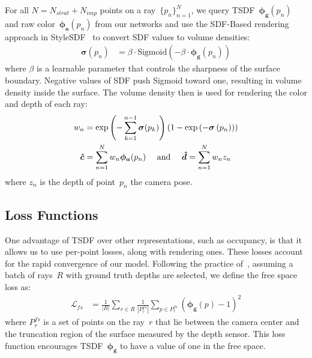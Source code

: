 For all $N=N_{strat}+N_{imp}$ points on a ray~$\{p_{n}\}_{n=1}^{N}$, we query TSDF~$\boldsymbol{\phi_{g}}(p_{n})$ and raw color~$\boldsymbol{\phi_{a}}(p_{n})$ from our networks and use the SDF-Based rendering approach in StyleSDF~\citep{or2022stylesdf} to convert SDF values to volume densities:
\begin{align}
	\boldsymbol{\sigma}(p_{n}) &= \beta \cdot \text{Sigmoid} \left(-\beta \cdot \boldsymbol{\phi_{g}}(p_{n}) \right)
\end{align}
where $\beta$ is a learnable parameter that controls the sharpness of the surface boundary. Negative values of SDF push Sigmoid toward one, resulting in volume density inside the surface. The volume density then is used for rendering the color and depth of each ray:
\begin{align}
    w_{n} &= \exp \left( -\sum_{k=1}^{n-1} \boldsymbol{\sigma}(p_{k}) \right) \left( 1 - \exp \left(-\boldsymbol{\sigma}\left(p_{n}\right) \right)\right) \notag 
    \\
	\boldsymbol{\hat{c}} &= \sum_{n=1}^{N} w_{n} \boldsymbol{\phi_{a}}(p_{n}) \text{\phantom{00} and \phantom{00}} \boldsymbol{\hat{d}} = \sum_{n=1}^{N} w_{n} z_{n}
\end{align}
where $z_{n}$ is the depth of point~$p_{n}$ \wrt the camera pose.

\subsection{Loss Functions} \label{sec:c4_losses}
One advantage of TSDF over other representations, such as occupancy, is that it allows us to use per-point losses, along with rendering ones. These losses account for the rapid convergence of our model. Following the practice of~\cite{azinovic2022neural}, assuming a batch of rays~$R$ with ground truth depths are selected, we define the free space loss as:
\begin{align}
	\mathcal{L}_{fs} &= \frac{1}{|R|} \sum_{r \in R} \frac{1}{|P_{r}^{fs}|} \sum_{p \in P_{r}^{fs}} (\boldsymbol{\phi_{g}}(p) - 1)^2
\end{align}
where $P_{r}^{fs}$ is a set of points on the ray~$r$ that lie between the camera center and the truncation region of the surface measured by the depth sensor. This loss function encourages TSDF~$\boldsymbol{\phi_{g}}$ to have a value of one in the free space.

